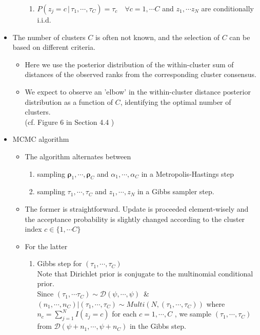 \documentclass[12pt]{article}
\begin{document}
\begin{itemize}
\begin{itemize}
\begin{enumerate}
            \item $P(z_j=c \,|\, \tau_1, \cdots, \tau_C)=\tau_c \quad \forall c=1,\cdots C$ and $z_1, \cdots z_N$ are conditionally i.i.d.
        \end{enumerate}
    \end{itemize}
    \item The number of clusters $C$ is often not known, and the selection of $C$ can be based on different criteria.
    \begin{itemize}
        \item Here we use the posterior distribution of the within-cluster sum of distances of the observed ranks from the corresponding cluster consensus.
        \item We expect to observe an 'elbow' in the within-cluster distance posterior distribution as a function of $C$, identifying the optimal number of clusters. \\ (cf. Figure 6 in Section 4.4 )
    \end{itemize}
    \item MCMC algorithm
    \begin{itemize}
        \item The algorithm alternates between 
        \begin{enumerate}
            \item sampling $\boldsymbol{\rho}_1, \cdots, \boldsymbol{\rho}_C$ and $\alpha_1, \cdots, \alpha_C$ in a Metropolis-Hastings step
            \item sampling $\tau_1, \cdots, \tau_C$ and $z_1, \cdots, z_N$ in a Gibbs sampler step.
        \end{enumerate}
        \item The former is straightforward. Update is proceeded element-wisely and the acceptance probability is slightly changed according to the cluster index $c\in \{1,\cdots C\}$
        \item For the latter
        \begin{enumerate}
            \item Gibbs step for $(\tau_1, \cdots, \tau_C)$ \\ Note that Dirichlet prior is conjugate to the multinomial conditional prior. \\ Since $(\tau_1, \cdots \tau_C)\sim \mathcal{D}(\psi, \cdots, \psi)$ \,\& $(n_1, \cdots, n_C)|(\tau_1, \cdots, \tau_C)\sim Multi(N, (\tau_1, \cdots, \tau_C))$ where $n_c=\sum_{j=1}^N I(z_j=c)$ for each $c=1, \cdots ,C$\; , we sample $(\tau_1, \cdots, \tau_C)$ from $\mathcal{D}(\psi+n_1, \cdots, \psi+n_C)$ in the Gibbs step. 

\end{enumerate}
\end{itemize}
\end{itemize}
\end{document}
